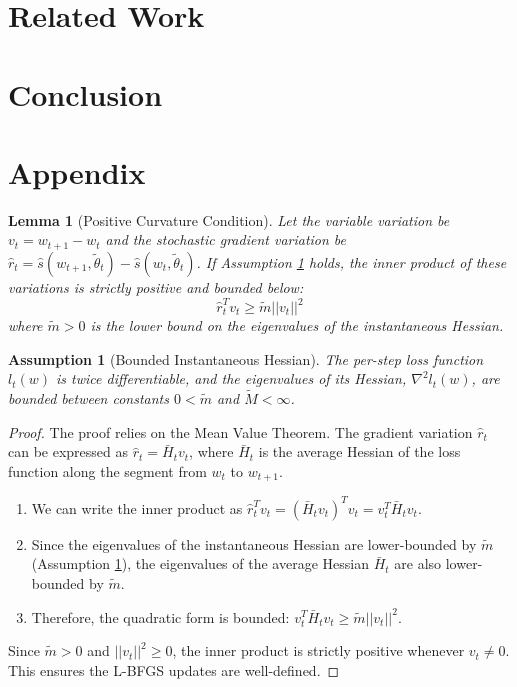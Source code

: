 \documentclass[a4paper,12pt]{article}
\newtheorem{lemma}[theorem]{Lemma}
\newtheorem{assumption}[theorem]{Assumption}
\begin{document}
\section{Related Work}

\section{Conclusion}


\section{Appendix}

\begin{lemma}[Positive Curvature Condition]
\label{lem:positive-curvature}
Let the variable variation be $v_t = w_{t+1} - w_t$ and the stochastic gradient variation be $\hat{r}_t = \hat{s}(w_{t+1}, \tilde{\theta}_t) - \hat{s}(w_t, \tilde{\theta}_t)$. If Assumption \ref{assum:bounded-hessian} holds, the inner product of these variations is strictly positive and bounded below:
$$
\hat{r}_t^T v_t \ge \tilde{m} ||v_t||^2
$$
where $\tilde{m} > 0$ is the lower bound on the eigenvalues of the instantaneous Hessian.
\end{lemma}

\begin{assumption}[Bounded Instantaneous Hessian]
\label{assum:bounded-hessian}
The per-step loss function $l_t(w)$ is twice differentiable, and the eigenvalues of its Hessian, $\nabla^2 l_t(w)$, are bounded between constants $0 < \tilde{m}$ and $\tilde{M} < \infty$.
\end{assumption}

\begin{proof}
The proof relies on the Mean Value Theorem. The gradient variation $\hat{r}_t$ can be expressed as $\hat{r}_t = \bar{H}_t v_t$, where $\bar{H}_t$ is the average Hessian of the loss function along the segment from $w_t$ to $w_{t+1}$.
\begin{enumerate}
    \item We can write the inner product as $\hat{r}_t^T v_t = ( \bar{H}_t v_t)^T v_t = v_t^T \bar{H}_t v_t$.
    
    \item Since the eigenvalues of the instantaneous Hessian are lower-bounded by $\tilde{m}$ (Assumption \ref{assum:bounded-hessian}), the eigenvalues of the average Hessian $\bar{H}_t$ are also lower-bounded by $\tilde{m}$.
    
    \item Therefore, the quadratic form is bounded: $v_t^T \bar{H}_t v_t \ge \tilde{m} ||v_t||^2$.
\end{enumerate}
Since $\tilde{m} > 0$ and $||v_t||^2 \ge 0$, the inner product is strictly positive whenever $v_t \neq 0$. This ensures the L-BFGS updates are well-defined.
\end{proof}
\end{document}
